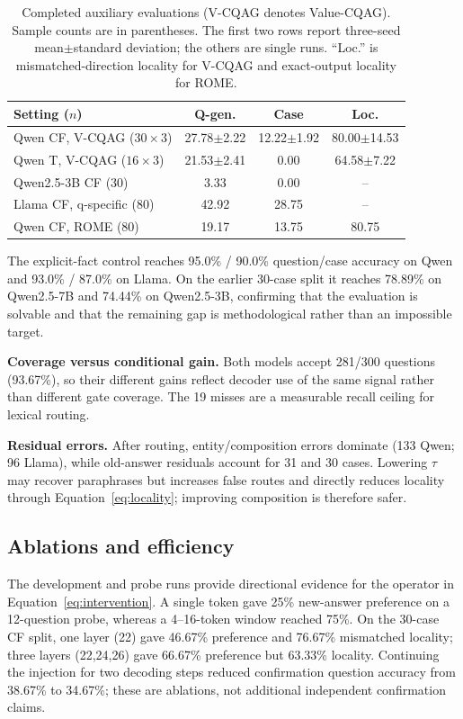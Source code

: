 \documentclass{article}
\begin{document}
\begin{table}[t]
\centering
\caption{Completed auxiliary evaluations (V-CQAG denotes Value-CQAG). Sample counts are in parentheses. The first two rows report three-seed mean$\pm$standard deviation; the others are single runs. ``Loc.'' is mismatched-direction locality for V-CQAG and exact-output locality for ROME.}
\label{tab:history}
\small
\setlength{\tabcolsep}{1.3pt}
\begin{tabular}{@{}lccc@{}}
\toprule
Setting ($n$) & Q-gen. & Case & Loc. \\
\midrule
Qwen CF, V-CQAG ($30\!\times\!3$) & 27.78$\pm$2.22 & 12.22$\pm$1.92 & 80.00$\pm$14.53 \\
Qwen T, V-CQAG ($16\!\times\!3$) & 21.53$\pm$2.41 & 0.00 & 64.58$\pm$7.22 \\
Qwen2.5-3B CF (30) & 3.33 & 0.00 & -- \\
Llama CF, q-specific (80) & 42.92 & 28.75 & -- \\
Qwen CF, ROME (80) & 19.17 & 13.75 & 80.75 \\
\bottomrule
\end{tabular}
\end{table}

The explicit-fact control reaches 95.0\% / 90.0\% question/case accuracy on Qwen and 93.0\% / 87.0\% on Llama. On the earlier 30-case split it reaches 78.89\% on Qwen2.5-7B and 74.44\% on Qwen2.5-3B, confirming that the evaluation is solvable and that the remaining gap is methodological rather than an impossible target.

\smallskip\noindent\textbf{Coverage versus conditional gain.} Both models accept 281/300 questions (93.67\%), so their different gains reflect decoder use of the same signal rather than different gate coverage. The 19 misses are a measurable recall ceiling for lexical routing.

\smallskip\noindent\textbf{Residual errors.} After routing, entity/composition errors dominate (133 Qwen; 96 Llama), while old-answer residuals account for 31 and 30 cases. Lowering $\tau$ may recover paraphrases but increases false routes and directly reduces locality through Equation~\ref{eq:locality}; improving composition is therefore safer.

\subsection{Ablations and efficiency}
The development and probe runs provide directional evidence for the operator in Equation~\ref{eq:intervention}. A single token gave 25\% new-answer preference on a 12-question probe, whereas a 4--16-token window reached 75\%. On the 30-case CF split, one layer (22) gave 46.67\% preference and 76.67\% mismatched locality; three layers (22,24,26) gave 66.67\% preference but 63.33\% locality. Continuing the injection for two decoding steps reduced confirmation question accuracy from 38.67\% to 34.67\%; these are ablations, not additional independent confirmation claims.
\end{document}
